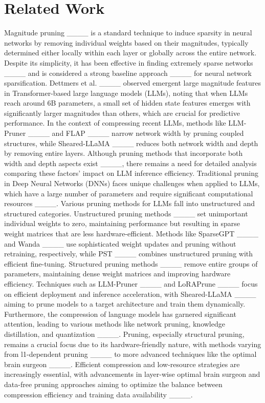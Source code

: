 \section{Related Work}
\label{sec:relWorks}
Magnitude pruning ____ is a standard technique to induce sparsity in neural networks by removing individual weights based on their magnitudes, typically determined either locally within each layer or globally across the entire network. Despite its simplicity, it has been effective in finding extremely sparse networks ____ and is considered a strong baseline approach ____ for neural network sparsification. Dettmers et al. ____ observed emergent large magnitude features in Transformer-based large language models (LLMs), noting that when LLMs reach around 6B parameters, a small set of hidden state features emerges with significantly larger magnitudes than others, which are crucial for predictive performance. In the context of compressing recent LLMs, methods like LLM-Pruner ____ and FLAP ____ narrow network width by pruning coupled structures, while Sheared-LLaMA ____ reduces both network width and depth by removing entire layers. Although pruning methods that incorporate both width and depth aspects exist ____, there remains a need for detailed analysis comparing these factors' impact on LLM inference efficiency. Traditional pruning in Deep Neural Networks (DNNs) faces unique challenges when applied to LLMs, which have a large number of parameters and require significant computational resources ____. Various pruning methods for LLMs fall into unstructured and structured categories. Unstructured pruning methods ____ set unimportant individual weights to zero, maintaining performance but resulting in sparse weight matrices that are less hardware-efficient. Methods like SparseGPT ____ and Wanda ____ use sophisticated weight updates and pruning without retraining, respectively, while PST ____ combines unstructured pruning with efficient fine-tuning. Structured pruning methods ____ remove entire groups of parameters, maintaining dense weight matrices and improving hardware efficiency. Techniques such as LLM-Pruner ____ and LoRAPrune ____ focus on efficient deployment and inference acceleration, with Sheared-LLaMA ____ aiming to prune models to a target architecture and train them dynamically. Furthermore, the compression of language models has garnered significant attention, leading to various methods like network pruning, knowledge distillation, and quantization ____. Pruning, especially structural pruning, remains a crucial focus due to its hardware-friendly nature, with methods varying from l1-dependent pruning ____ to more advanced techniques like the optimal brain surgeon ____. Efficient compression and low-resource strategies are increasingly essential, with advancements in layer-wise optimal brain surgeon and data-free pruning approaches aiming to optimize the balance between compression efficiency and training data availability ____.